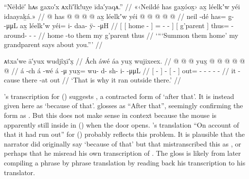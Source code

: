 
\ex\label{ex:92-69-come-home-grandparent-says-of-you}%
%
\begingl
	\glpreamble	“Nēłdē′ hᴀs g̣axo′x ᴀxłī′łk!uỵe īda′yaqᴀ.” //
	\glpreamble	«\!‹\!Neildé has g̱ax̱óox̱\!› ax̱ léelkʼw yéi idaayaḵá.\!» //
	\gla	{} {}  @ {} {}
			has @  @ {} @ {} @ {} {}
		{} ax̱ léelkʼw {}
		yéi @  @ {} @ {} @ {} @ {} //
	\glb	{} {} neil -dé {}
			has= g̱- {}  -μμL {}
		{} ax̱ léelkʼw {}
		yéi= i- daa- ÿ-  -μH //
	\glc	{}[ {}[ home - {}]
			= - \·  - {}]
		{}[  g’parent {}]
		thus= - around- -  - //
	\gld	{} {} home -to {}
			them  {} {} {} {}
		{} my g’parent {}
		thus  {} {} {} {} //
	\glft	‘“‘Summon them home’ my grandparent says about you.”’
		//
\endgl
\xe


\ex\label{ex:92-70-thats-why-ran-outside}%
%
\begingl
	\glpreamble	ᴀtxa′we ā′yux wudjîx̣ī′x̣ //
	\glpreamble	Ách áwé áa yux̱ wujixeex. //
	\gla	{}  @ {} {}  @ {}
		{}  @ {} {}
		yux̱ @  @ {} @ {} @ {} @ {} @ {}  //
	\glb	{} á -ch {} á -wé
		{} á -μ {}
		yux̱= wu- d- sh- i-  -μμL //
	\glc	{}[  - {}]  -
		{}[  - {}]
		out= - - - -  - //
	\gld	{} it -cause {}  {}
		{} there -at {} 
		out  {} {} {} {} {} //
	\glft	‘That is why it ran outside there.’
		//
\endgl
\xe

\citeauthor{swanton:1909}’s transcription  for (\lastx) suggests , a contracted form of  ‘after that’.
It is instead given here as  ‘because of that’.
\citeauthor{swanton:1909} glosses  as “After that”, seemingly confirming the form as .
But this does not make sense in context because the mouse is apparently still inside in (\nextx) when the door opens.
\citeauthor{swanton:1909}’s translation “On account of that it had run out” for (\lastx) probably reflects this problem.
It is plausible that the narrator did originally say  ‘because of that’ but that \citeauthor{swanton:1909} mistranscribed this as , or perhaps that he misread his own transcription of .
The gloss is likely from \citeauthor{swanton:1909} later compiling a phrase by phrase translation by reading back his transcription to his translator.

